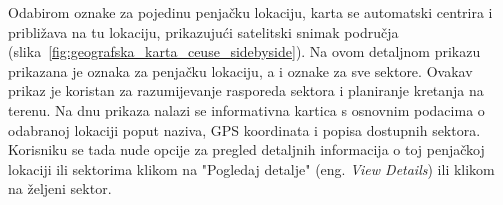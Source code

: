 Odabirom oznake za pojedinu penjačku lokaciju, karta se automatski centrira i približava na tu lokaciju, prikazujući satelitski snimak područja (slika~\ref{fig:geografska_karta_ceuse_sidebyside}). Na ovom detaljnom prikazu prikazana je oznaka za penjačku lokaciju, a i oznake za sve sektore. Ovakav prikaz je koristan za razumijevanje rasporeda sektora i planiranje kretanja na terenu. Na dnu prikaza nalazi se informativna kartica s osnovnim podacima o odabranoj lokaciji poput naziva, GPS koordinata i popisa dostupnih sektora. Korisniku se tada nude opcije za pregled detaljnih informacija o toj penjačkoj lokaciji ili sektorima klikom na "Pogledaj detalje" (eng. \textit{View Details}) ili klikom na željeni sektor.
